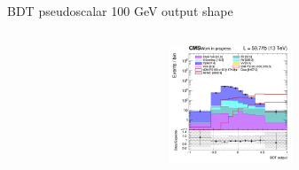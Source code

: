 \documentclass[8pt]{beamer}
\begin{document}
\begin{frame}{BDT pseudoscalar 100 GeV output shape}
\begin{columns}
\begin{column}{0.33\textwidth}
\begin{center}
     			\includegraphics[width=1.0\textwidth, height=100pt]{figs/2018/SmearSR-ttDM-pseudo100/log_cratio_TTbar_topCR_ll_BDT_ttDM100_TTbar_BDT_output_pseudoscalar100_customBinsAttempt7.png}
    		\end{center}		
		\end{column}
\end{columns} \vfill
\end{frame}
\end{document}
